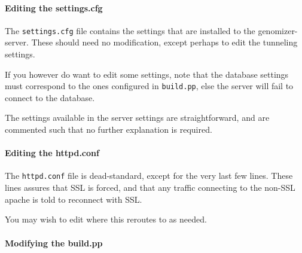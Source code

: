 \begin{Shaded}
\begin{Highlighting}[numbers=left,,]
  
\end{Highlighting}
\end{Shaded}

\paragraph{Editing the settings.cfg}\label{editing-the-settings.cfg}

The \texttt{settings.cfg} file contains the settings that are installed
to the genomizer-server. These should need no modification, except
perhaps to edit the tunneling settings.

If you however do want to edit some settings, note that the database
settings must correspond to the ones configured in \texttt{build.pp},
else the server will fail to connect to the database.

The settings available in the server settings are straightforward, and
are commented such that no further explanation is required.

\paragraph{Editing the httpd.conf}\label{editing-the-httpd.conf}

The \texttt{httpd.conf} file is dead-standard, except for the very last
few lines. These lines assures that SSL is forced, and that any traffic
connecting to the non-SSL apache is told to reconnect with SSL.

\begin{Shaded}
\begin{Highlighting}[]
 \KeywordTok{>}
\end{Highlighting}
\end{Shaded}

You may wish to edit where this reroutes to as needed.

\paragraph{Modifying the build.pp}\label{modifying-the-build.pp}

